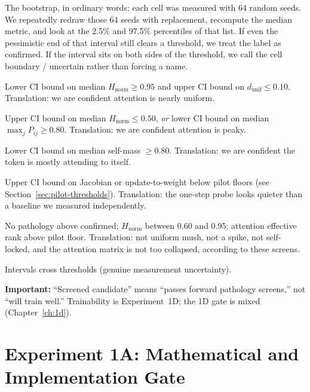 \documentclass[11pt,a4paper]{report}
\newcommand{\Hnorm}{H_{\mathrm{norm}}}
\begin{document}
The bootstrap, in ordinary words: each cell was measured with 64 random seeds. We repeatedly redraw those 64 seeds with replacement, recompute the median metric, and look at the 2.5\% and 97.5\% percentiles of that list. If even the pessimistic end of that interval still clears a threshold, we treat the label as confirmed. If the interval sits on both sides of the threshold, we call the cell boundary / uncertain rather than forcing a name.

\begin{description}[style=nextline,leftmargin=2.6cm]
  \item[Diffuse]
    Lower CI bound on median $\Hnorm \ge 0.95$ and upper CI bound on $d_{\mathrm{unif}}\le 0.10$. Translation: we are confident attention is nearly uniform.
  \item[Concentrated]
    Upper CI bound on median $\Hnorm\le 0.50$, \emph{or} lower CI bound on median $\max_j P_{ij}\ge 0.80$. Translation: we are confident attention is peaky.
  \item[Self-locked]
    Lower CI bound on median self-mass $\ge 0.80$. Translation: we are confident the token is mostly attending to itself.
  \item[Gradient-starved]
    Upper CI bound on Jacobian or update-to-weight below pilot floors (see Section~\ref{sec:pilot-thresholds}). Translation: the one-step probe looks quieter than a baseline we measured independently.
  \item[Screened candidate]
    No pathology above confirmed; $\Hnorm$ between $0.60$ and $0.95$; attention effective rank above pilot floor. Translation: not uniform mush, not a spike, not self-locked, and the attention matrix is not too collapsed, according to these screens.
  \item[Boundary / uncertain]
    Intervals cross thresholds (genuine measurement uncertainty).
\end{description}

\textbf{Important:} ``Screened candidate'' means ``passes forward pathology screens,'' not ``will train well.'' Trainability is Experiment~1D; the 1D gate is mixed (Chapter~\ref{ch:1d}).

\chapter{Experiment 1A: Mathematical and Implementation Gate}
\end{document}
